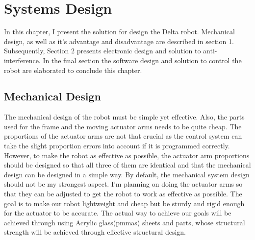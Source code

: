 \chapter{Systems Design}

In this chapter, I present the solution for design the Delta robot. 
Mechanical design, as well as it's advantage and disadvantage are described in section 1. Subsequently, Section 2 presents electronic design and solution to anti-interference. In the final section the software design and solution to control the robot are elaborated to conclude this chapter.

\section{Mechanical Design}

The mechanical design of the robot must be simple yet effective. Also, the parts used for the frame and the moving actuator arms needs to be quite cheap. The proportions of the actuator arms are not that crucial as the control system can take the slight proportion errors into account if it is programmed correctly. However, to make the robot as effective as possible, the actuator arm proportions should be designed so that all three of them are identical and that the mechanical design can be designed in a simple way. By default, the mechanical system design should not be my strongest aspect. I'm planning on doing the actuator arms so that they can be adjusted to get the robot to work as effective as possible. The goal is to make our robot lightweight and cheap but be sturdy and rigid enough for the actuator to be  accurate. The actual way to achieve our goals will be achieved through using Acrylic glass(\glspl{pmma}) sheets and parts, whose structural strength will be achieved through effective structural design.

